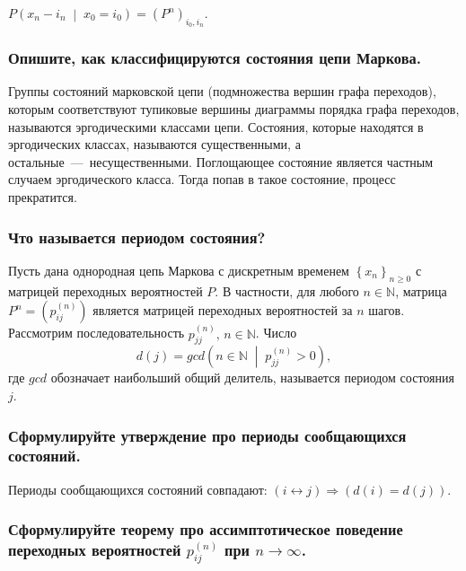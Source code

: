 $P \left( x_n - i_n \; \middle| \; x_0 = i_0 \right) =
  \left( P^n \right)_{i_0, i_n}$.

\subsubsection*{Опишите, как классифицируются состояния цепи Маркова.}

Группы состояний марковской цепи (подмножества вершин графа переходов),
которым соответствуют тупиковые вершины диаграммы порядка графа переходов,
называются эргодическими классами цепи.
Состояния, которые находятся в эргодических классах, называются существенными,
а остальные~---~несущественными.
Поглощающее состояние является частным случаем эргодического класса.
Тогда попав в такое состояние, процесс прекратится.

\subsubsection*{Что называется периодом состояния?}

Пусть дана однородная цепь Маркова с дискретным временем $ \left\{ x_n \right\}_{n \geq 0}$
с матрицей переходных вероятностей $P$.
В частности, для любого $n \in \mathbb{N}$,
матрица $P^n = \left( p_{ij}^{ \left( n \right) } \right) $
является матрицей переходных вероятностей за $n$ шагов.
Рассмотрим последовательность $p_{jj}^{ \left( n \right) }, \, n \in \mathbb{N}$.
Число
\begin{equation*}
  d \left( j \right) =
  gcd \left( n \in \mathbb{N} \; \middle| \; p_{jj}^{ \left( n \right) } > 0 \right),
\end{equation*}
где $gcd$ обозначает наибольший общий делитель, называется периодом состояния $j$.

\subsubsection*{Сформулируйте утверждение про периоды сообщающихся состояний.}

Периоды сообщающихся состояний совпадают:
$ \left( i \leftrightarrow j \right) \Rightarrow \left( d \left( i \right) =
  d \left( j \right) \right) $.

\subsubsection*{Сформулируйте теорему про ассимптотическое поведение переходных вероятностей
                $p_{ij}^{ \left( n \right) }$ при $n \to \infty $.}

